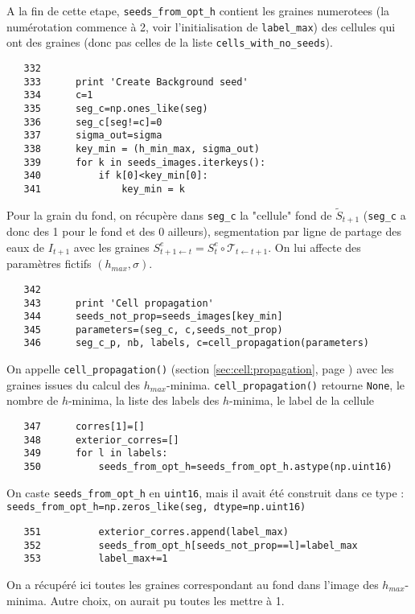 \documentclass{article}
\def \mycolor {red}
\begin{document}
\color{\mycolor}
A la fin de cette etape, \verb|seeds_from_opt_h| contient les graines numerotees (la num\'erotation commence \`a 2, voir l'initialisation de \verb|label_max|) des cellules qui ont des graines (donc pas celles de la liste \verb|cells_with_no_seeds|).  
\color{black}
\begin{verbatim}   
   332	
   333		print 'Create Background seed'
   334	    c=1
   335	    seg_c=np.ones_like(seg)
   336	    seg_c[seg!=c]=0
   337	    sigma_out=sigma
   338	    key_min = (h_min_max, sigma_out)
   339	    for k in seeds_images.iterkeys():
   340	    	if k[0]<key_min[0]:
   341	    		key_min = k
\end{verbatim} 
\color{\mycolor}
Pour la grain du fond, on r\'ecup\`ere dans \verb|seg_c| la "cellule" fond de $\tilde{S}_{t+1}$ (\verb|seg_c| a donc des 1 pour le fond et des 0 ailleurs), segmentation par ligne de partage des eaux de $I_{t+1}$ avec les graines $S^e_{t+1 \leftarrow t} = S^e_t \circ \mathcal{T}_{t \leftarrow t+1}$. On lui affecte des param\`etres fictifs $(h_{max}, \sigma)$.
\color{black}
\begin{verbatim}
   342	
   343	    print 'Cell propagation'
   344	    seeds_not_prop=seeds_images[key_min]
   345	    parameters=(seg_c, c,seeds_not_prop)
   346	    seg_c_p, nb, labels, c=cell_propagation(parameters)
\end{verbatim} 
\color{\mycolor}
On appelle \texttt{cell\_propagation()} (section \ref{sec:cell:propagation}, page \pageref{sec:cell:propagation}) avec les graines issues du calcul des $h_{max}$-minima. \texttt{cell\_propagation()} retourne \texttt{None}, le nombre de $h$-minima, la liste des labels des $h$-minima, le label de la cellule
\color{black}
\begin{verbatim}
   347	    corres[1]=[]
   348	    exterior_corres=[]
   349	    for l in labels:
   350	        seeds_from_opt_h=seeds_from_opt_h.astype(np.uint16)
\end{verbatim} 
\color{\mycolor}
On caste \verb|seeds_from_opt_h| en \verb|uint16|, mais il avait \'et\'e construit dans ce type : 
\verb|seeds_from_opt_h=np.zeros_like(seg, dtype=np.uint16)|
\color{black}
\begin{verbatim}
   351	        exterior_corres.append(label_max)
   352	        seeds_from_opt_h[seeds_not_prop==l]=label_max
   353	        label_max+=1
\end{verbatim} 
\color{\mycolor}
On a r\'ecup\'er\'e ici toutes les graines correspondant au fond dans l'image des $h_{max}$-minima. Autre choix, on aurait pu toutes les mettre \`a 1.
\end{document}

